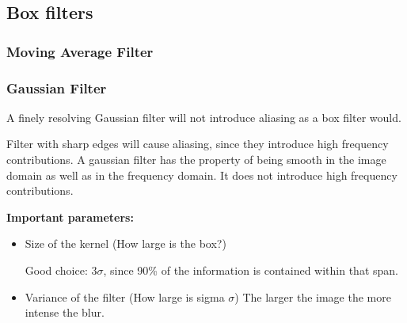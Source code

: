 \documentclass[10pt,a4paper]{scrartcl}
\begin{document}
\begin{multicols*}{2}

\subsection{Box filters}

\subsubsection{Moving Average Filter}



\subsubsection{Gaussian Filter}


A finely resolving Gaussian filter will not introduce aliasing as a box filter would.


Filter with sharp edges will cause aliasing, since they introduce high frequency contributions. A gaussian filter has the property of being smooth in the image domain as well as in the frequency domain. It does not introduce high frequency contributions.

\textbf{Important parameters:}

\begin{itemize}
\item Size of the kernel (How large is the box?)

Good choice: 3$\sigma$, since 90\% of the information is contained within that span.
\item Variance of the filter (How large is sigma $\sigma$)
The larger the image the more intense the blur.

\end{itemize}


\end{multicols*}
\end{document}
